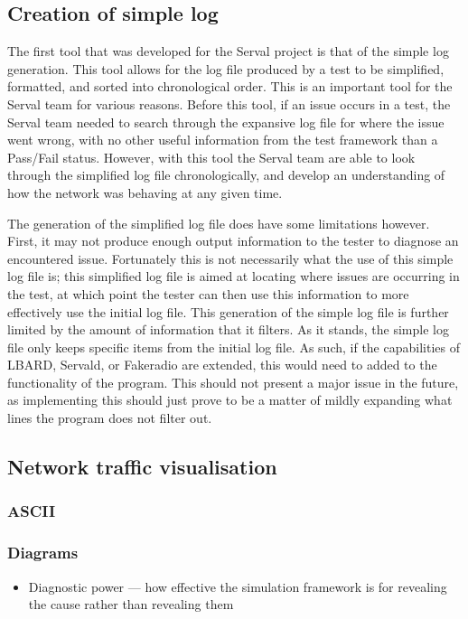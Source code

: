 \subsection{Creation of simple log}
The first tool that was developed for the Serval project is that of the simple log generation.
This tool allows for the log file produced by a test to be simplified, formatted, and sorted into chronological order.
This is an important tool for the Serval team for various reasons.
Before this tool, if an issue occurs in a test, the Serval team needed to search through the expansive log file for where the issue went wrong, with no other useful information from the test framework than a Pass/Fail status.
However, with this tool the Serval team are able to look through the simplified log file chronologically, and develop an understanding of how the network was behaving at any given time.

The generation of the simplified log file does have some limitations however.
First, it may not produce enough output information to the tester to diagnose an encountered issue.
Fortunately this is not necessarily what the use of this simple log file is; this simplified log file is aimed at locating where issues are occurring in the test, at which point the tester can then use this information to more effectively use the initial log file.
This generation of the simple log file is further limited by the amount of information that it filters.
As it stands, the simple log file only keeps specific items from the initial log file.
As such, if the capabilities of LBARD, Servald, or Fakeradio are extended, this would need to added to the functionality of the program.
This should not present a major issue in the future, as implementing this should just prove to be a matter of mildly expanding what lines the program does not filter out.

\subsection{Network traffic visualisation}

\subsubsection{ASCII}


\subsubsection{Diagrams}
\begin{itemize}
    \item Diagnostic power — how effective the simulation framework is for revealing the cause rather than revealing them 
\end{itemize}


